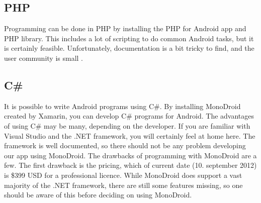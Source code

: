 \subsection{PHP}
Programming can be done in PHP by installing the PHP for Android app and PHP library. This includes a lot of scripting to do common Android tasks, but it is certainly feasible. Unfortunately, documentation is a bit tricky to find, and the user community is small \cite{bib:php}.

\subsection{C\#}
It is possible to write Android programs using C\#. By installing MonoDroid created by Xamarin\cite{bib:mbx}, you can develop C\# programs for Android. The advantages of using C\# may be many, depending on the developer. If you are familiar with Visual Studio and the .NET framework, you will certainly feel at home here. The framework is well documented, so there should not be any problem developing our app using MonoDroid.
\newline
\newline
The drawbacks of programming with MonoDroid are a few. The first drawback is the pricing, which of current date (10. september 2012) is \$399 USD for a professional licence. While MonoDroid does support a vast majority of the .NET framework, there are still some features missing, so one should be aware of this before deciding on using MonoDroid.







